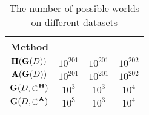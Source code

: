 


\begin{table}
	\centering
	\caption{The number of possible worlds on different datasets}
	{\small
		\begin{tabular}{cccc}
			\hline
			{\bf Method} & {\bf \nursery} & {\bf \hr} & {\bf \adult} \\
			\hline	
			$\mathbf{H}(\mathbf{G}(D))$ & $10^{201}$ & $10^{201}$ & $10^{202}$ \\
			$\mathbf{A}(\mathbf{G}(D))$ & $10^{201}$ & $10^{201}$ & $10^{202}$ \\
			$\mathbf{G}(D,\circlearrowleft^\mathbf{H})$ & $10^3$ & $10^3$ & $10^4$ \\
			$\mathbf{G}(D,\circlearrowleft^\mathbf{A})$ & $10^3$ & $10^3$ & $10^4$ \\
			\hline
		\end{tabular}
	}
	\label{tbl:pwnum}
	\vspace{-1em}
\end{table}




